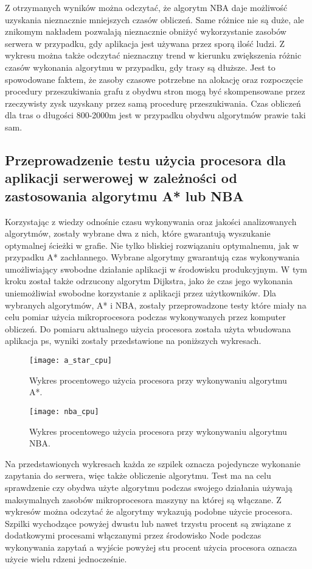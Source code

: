Z otrzymanych wyników można odczytać, że algorytm NBA daje możliwość uzyskania nieznacznie mniejszych czasów obliczeń. Same różnice nie są duże, ale znikomym nakładem pozwalają nieznacznie obniżyć wykorzystanie zasobów serwera w przypadku, gdy aplikacja jest używana przez sporą ilość ludzi. Z wykresu można także odczytać nieznaczny trend w kierunku zwiększenia różnic czasów wykonania algorytmu w przypadku, gdy trasy są dłuższe. Jest to spowodowane faktem, że zasoby czasowe potrzebne na alokację oraz rozpoczęcie procedury przeszukiwania grafu z obydwu stron mogą być skompensowane przez rzeczywisty zysk uzyskany przez samą procedurę przeszukiwania. Czas obliczeń dla tras o długości 800-2000m jest w przypadku obydwu algorytmów prawie taki sam.

\subsection{Przeprowadzenie testu użycia procesora dla aplikacji serwerowej w zależności od zastosowania algorytmu A* lub NBA}

Korzystając z wiedzy odnośnie czasu wykonywania oraz jakości analizowanych algorytmów, zostały wybrane dwa z nich, które gwarantują wyszukanie optymalnej ścieżki w grafie. Nie tylko bliskiej rozwiązaniu optymalnemu, jak w przypadku A* zachłannego. Wybrane algorytmy gwarantują czas wykonywania umożliwiający swobodne działanie aplikacji w środowisku produkcyjnym. W tym kroku został także odrzucony algorytm Dijkstra, jako że czas jego wykonania uniemożliwiał swobodne korzystanie z aplikacji przez użytkowników. Dla wybranych algorytmów, A* i NBA, zostały przeprowadzone testy które miały na celu pomiar użycia mikroprocesora podczas wykonywanych przez komputer obliczeń. Do pomiaru aktualnego użycia procesora została użyta wbudowana aplikacja ps, wyniki zostały przedstawione na poniższych wykresach.

\begin{figure}[H]
\centering
\texttt{[image: a\_star\_cpu]}
\caption{Wykres procentowego użycia procesora przy wykonywaniu algorytmu A*.}
\end{figure}

\begin{figure}[H]
\centering
\texttt{[image: nba\_cpu]}
\caption{Wykres procentowego użycia procesora przy wykonywaniu algorytmu NBA.}
\end{figure}

Na przedstawionych wykresach każda ze szpilek oznacza pojedyncze wykonanie zapytania do serwera, więc także obliczenie algorytmu. Test ma na celu sprawdzenie czy obydwa użyte algorytmu podczas swojego działania używają maksymalnych zasobów mikroprocesora maszyny na której są włączane. Z wykresów można odczytać że algorytmy wykazują podobne użycie procesora. Szpilki wychodzące powyżej dwustu lub nawet trzystu procent są związane z dodatkowymi procesami włączanymi przez środowisko Node podczas wykonywania zapytań a wyjście powyżej stu procent użycia procesora oznacza użycie wielu rdzeni jednocześnie.

